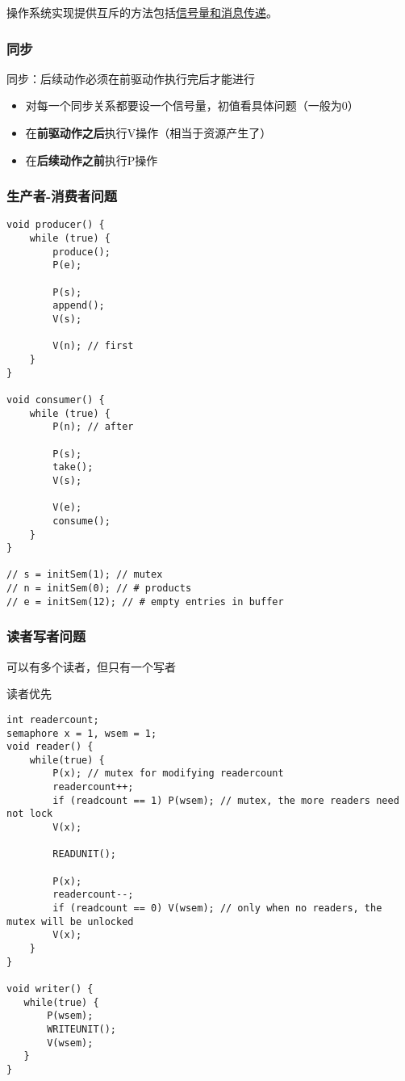 操作系统实现提供互斥的方法包括\underline{信号量和消息传递}。

\subsubsection{同步}
同步：后续动作必须在前驱动作执行完后才能进行
\begin{itemize}
    \item 对每一个同步关系都要设一个信号量，初值看具体问题（一般为0）
    \item 在\textbf{前驱动作之后}执行V操作（相当于资源产生了）
    \item 在\textbf{后续动作之前}执行P操作
\end{itemize}

\subsubsection{生产者-消费者问题}
\begin{lstlisting}
void producer() {
    while (true) {
        produce();
        P(e);

        P(s);
        append();
        V(s);

        V(n); // first
    }
}

void consumer() {
    while (true) {
        P(n); // after

        P(s);
        take();
        V(s);

        V(e);
        consume();
    }
}

// s = initSem(1); // mutex
// n = initSem(0); // # products
// e = initSem(12); // # empty entries in buffer
\end{lstlisting}

\subsubsection{读者写者问题}
可以有多个读者，但只有一个写者

读者优先
\begin{lstlisting}
int readercount;
semaphore x = 1, wsem = 1;
void reader() {
    while(true) {
        P(x); // mutex for modifying readercount
        readercount++;
        if (readcount == 1) P(wsem); // mutex, the more readers need not lock
        V(x);

        READUNIT();

        P(x);
        readercount--;
        if (readcount == 0) V(wsem); // only when no readers, the mutex will be unlocked
        V(x);
    }
}

void writer() {
   while(true) {
       P(wsem);
       WRITEUNIT();
       V(wsem);
   }
}
\end{lstlisting}

